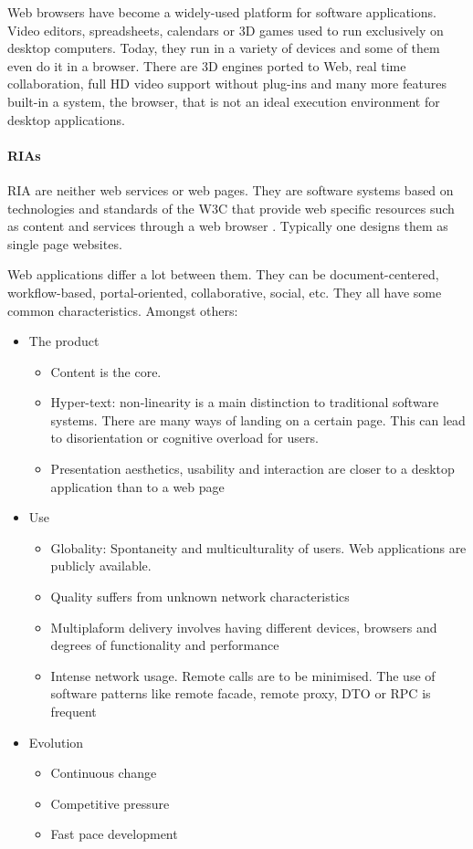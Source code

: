 Web browsers have become a widely-used platform for software applications. 
Video editors, spreadsheets, calendars or 3D games used to run exclusively on desktop computers. 
Today, they run in a variety of devices and some of them even do it in a browser. 
There are 3D engines ported to Web, real time collaboration, full HD video support without plug-ins and many more features built-in a system, the browser, that is not an ideal execution environment for desktop applications.

\paragraph{\acp{RIA}}
\acs{RIA} are neither web services or web pages. 
They are software systems based on technologies and standards of the \ac{W3C} that provide web specific resources such as content and services through a web browser \cite{Kappel:2006}.
Typically one designs them as single page websites.

Web applications differ a lot between them. 
They can be document-centered, workflow-based, portal-oriented, collaborative, social, etc. 
They all have some common characteristics. Amongst others:
\begin{itemize}
    \item The product
    \begin{itemize}
        \item Content is the core.
        \item Hyper-text: non-linearity is a main distinction to traditional software systems. There are many ways of landing on a certain page. This can lead to disorientation or cognitive overload for users.
        \item Presentation aesthetics, usability and interaction are closer to a desktop application than to a web page
    \end{itemize}
    \item Use
    \begin{itemize}
        \item Globality: Spontaneity and multiculturality of users. Web applications are publicly available.
        \item Quality suffers from unknown network characteristics
        \item Multiplaform delivery involves having different devices, browsers and degrees of functionality and performance
        \item Intense network usage. Remote calls are to be minimised. The use of software patterns like remote facade, remote proxy, DTO or RPC is frequent
    \end{itemize}
    \item Evolution
    \begin{itemize}
         \item Continuous change
         \item Competitive pressure
         \item Fast pace development
    \end{itemize}   
\end{itemize}

